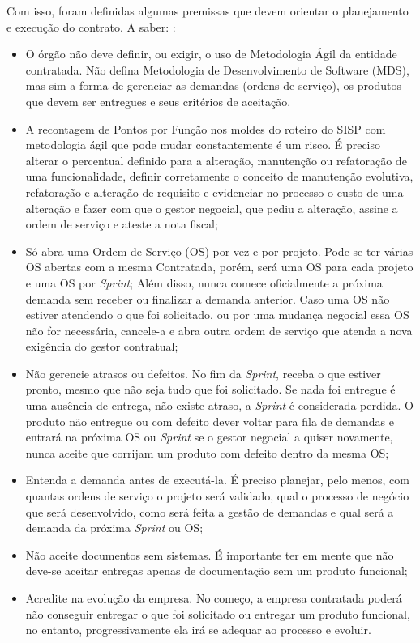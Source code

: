 Com isso, foram definidas algumas premissas que devem orientar o planejamento e execução do contrato. A saber:  \cite{parente}:
\begin{itemize}
\item O órgão não deve definir, ou exigir, o uso de Metodologia Ágil da entidade contratada. Não defina Metodologia de Desenvolvimento de Software (MDS), mas sim a
forma de gerenciar as demandas (ordens de serviço), os produtos que devem ser entregues e seus critérios de aceitação. 
\item A recontagem de Pontos por Função nos moldes do roteiro do SISP com metodologia ágil que pode mudar constantemente é um risco. É preciso alterar o percentual definido para a alteração, manutenção ou refatoração de uma funcionalidade, definir corretamente o conceito de manutenção evolutiva, refatoração e alteração de requisito e evidenciar no processo o custo de uma alteração e fazer com que o gestor negocial, que pediu a alteração, assine a ordem de serviço e ateste a nota fiscal;
\item Só abra uma Ordem de Serviço (OS) por vez e por projeto. Pode-se ter várias OS abertas com a mesma Contratada, porém, será uma OS para cada projeto e uma OS por \textit{Sprint}; Além disso, nunca comece oficialmente a próxima demanda sem receber ou finalizar a demanda anterior. Caso uma OS não estiver atendendo o que foi solicitado, ou por uma mudança negocial essa OS não for necessária, cancele-a e abra outra ordem de serviço que atenda a nova exigência do gestor contratual;
\item Não gerencie atrasos ou defeitos. No fim da \textit{Sprint}, receba o que estiver pronto, mesmo que não seja tudo que foi solicitado. Se nada foi entregue é uma ausência de entrega, não existe atraso, a \textit{Sprint} é considerada perdida. O produto não entregue ou com defeito dever voltar para fila de demandas e entrará na próxima OS ou \textit{Sprint} se o gestor negocial a quiser novamente, nunca aceite que corrijam um produto com defeito dentro da mesma OS;
\item Entenda a demanda antes de executá-la. É preciso planejar, pelo menos, com quantas ordens de serviço o projeto será validado, qual o processo de negócio que será desenvolvido, como será feita a gestão de demandas e qual será a demanda da próxima \textit{Sprint} ou OS;
\item Não aceite documentos sem sistemas. É importante ter em mente que não deve-se aceitar entregas apenas de documentação sem um produto funcional;
\item Acredite na evolução da empresa. No começo, a empresa contratada poderá não conseguir entregar o que foi solicitado ou entregar um produto funcional, no entanto, progressivamente ela irá se adequar ao processo e evoluir. 
\end{itemize} 

